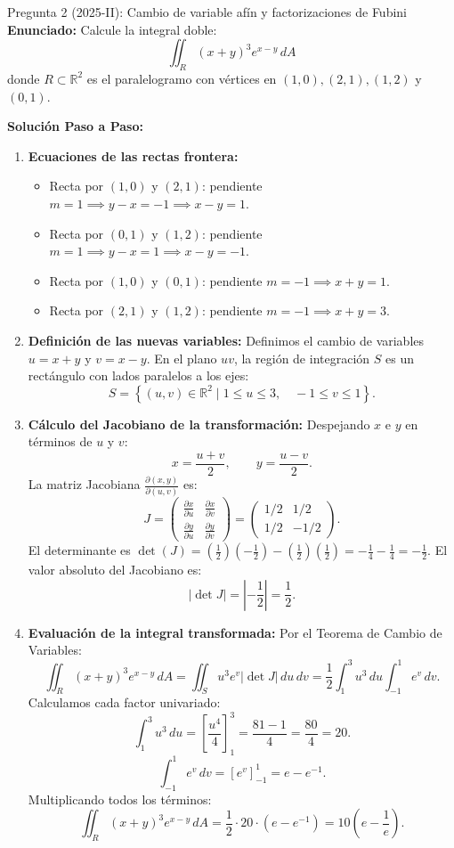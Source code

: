 \documentclass[11pt,a4paper]{article}
\begin{document}
\begin{ejerciciobox}{Pregunta 2 (2025-II): Cambio de variable afín y factorizaciones de Fubini}
\textbf{Enunciado:} Calcule la integral doble:
\[
\iint_R (x + y)^3 e^{x - y} \, dA
\]
donde $R \subset \mathbb{R}^2$ es el paralelogramo con vértices en $(1,0), (2,1), (1,2)$ y $(0,1)$.

\tcblower
\textbf{Solución Paso a Paso:}
\begin{enumerate}[leftmargin=*]
\item \textbf{Ecuaciones de las rectas frontera:}
\begin{itemize}
\item Recta por $(1,0)$ y $(2,1)$: pendiente $m = 1 \implies y - x = -1 \implies x - y = 1$.
\item Recta por $(0,1)$ y $(1,2)$: pendiente $m = 1 \implies y - x = 1 \implies x - y = -1$.
\item Recta por $(1,0)$ y $(0,1)$: pendiente $m = -1 \implies x + y = 1$.
\item Recta por $(2,1)$ y $(1,2)$: pendiente $m = -1 \implies x + y = 3$.
\end{itemize}
\item \textbf{Definición de las nuevas variables:}
Definimos el cambio de variables $u = x + y$ y $v = x - y$.
En el plano $uv$, la región de integración $S$ es un rectángulo con lados paralelos a los ejes:
\[
S = \left\{ (u,v) \in \mathbb{R}^2 \mid 1 \leq u \leq 3, \quad -1 \leq v \leq 1 \right\}.
\]
\item \textbf{Cálculo del Jacobiano de la transformación:}
Despejando $x$ e $y$ en términos de $u$ y $v$:
\[
x = \frac{u + v}{2}, \qquad y = \frac{u - v}{2}.
\]
La matriz Jacobiana $\frac{\partial(x,y)}{\partial(u,v)}$ es:
\[
J = \begin{pmatrix} \frac{\partial x}{\partial u} & \frac{\partial x}{\partial v} \\ \frac{\partial y}{\partial u} & \frac{\partial y}{\partial v} \end{pmatrix} = \begin{pmatrix} 1/2 & 1/2 \\ 1/2 & -1/2 \end{pmatrix}.
\]
El determinante es $\det(J) = \left(\frac{1}{2}\right)\left(-\frac{1}{2}\right) - \left(\frac{1}{2}\right)\left(\frac{1}{2}\right) = -\frac{1}{4} - \frac{1}{4} = -\frac{1}{2}$.
El valor absoluto del Jacobiano es:
\[
\left| \det J \right| = \left| -\frac{1}{2} \right| = \frac{1}{2}.
\]
\item \textbf{Evaluación de la integral transformada:}
Por el Teorema de Cambio de Variables:
\[
\iint_R (x+y)^3 e^{x-y} \, dA = \iint_S u^3 e^v \left| \det J \right| \, du \, dv = \frac{1}{2} \int_1^3 u^3 \, du \int_{-1}^1 e^v \, dv.
\]
Calculamos cada factor univariado:
\[
\int_1^3 u^3 \, du = \left[ \frac{u^4}{4} \right]_1^3 = \frac{81 - 1}{4} = \frac{80}{4} = 20.
\]
\[
\int_{-1}^1 e^v \, dv = [e^v]_{-1}^1 = e - e^{-1}.
\]
Multiplicando todos los términos:
\[
\iint_R (x+y)^3 e^{x-y} \, dA = \frac{1}{2} \cdot 20 \cdot (e - e^{-1}) = 10 \left( e - \frac{1}{e} \right).
\]
\end{enumerate}
\end{ejerciciobox}
\end{document}
